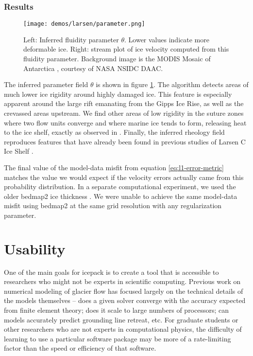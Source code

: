 \documentclass[journal abbreviation, manuscript]{copernicus}
\begin{document}
\subsubsection{Results}

\begin{figure}[h]
    \texttt{[image: demos/larsen/parameter.png]}
    \caption{Left: Inferred fluidity parameter $\theta$.
    Lower values indicate more deformable ice.
    Right: stream plot of ice velocity computed from this fluidity parameter.
    Background image is the MODIS Mosaic of Antarctica \citep{scambos2007modis, haran2014modis}, courtesy of NASA NSIDC DAAC.}
    \label{fig:larsen}
\end{figure}

The inferred parameter field $\theta$ is shown in figure \ref{fig:larsen}.
The algorithm detects areas of much lower ice rigidity around highly damaged ice.
This feature is especially apparent around the large rift emanating from the Gipps Ice Rise, as well as the crevassed areas upstream.
We find other areas of low rigidity in the suture zones where two flow units converge and where marine ice tends to form, releasing heat to the ice shelf, exactly as observed in \citet{holland2009marine}.
Finally, the inferred rheology field reproduces features that have already been found in previous studies of Larsen C Ice Shelf \citep{khazendar2011acceleration}.

The final value of the model-data misfit from equation \eqref{eq:l1-error-metric} matches the value we would expect if the velocity errors actually came from this probability distribution.
In a separate computational experiment, we used the older bedmap2 ice thickness \citep{fretwell2013bedmap2}.
We were unable to achieve the same model-data misfit using bedmap2 at the same grid resolution with any regularization parameter.


\section{Usability}

One of the main goals for icepack is to create a tool that is accessible to researchers who might not be experts in scientific computing.
Previous work on numerical modeling of glacier flow has focused largely on the technical details of the models themselves -- does a given solver converge with the accuracy expected from finite element theory; does it scale to large numbers of processors; can models accurately predict grounding line retreat, etc.
For graduate students or other researchers who are not experts in computational physics, the difficulty of learning to use a particular software package may be more of a rate-limiting factor than the speed or efficiency of that software.
\end{document}
